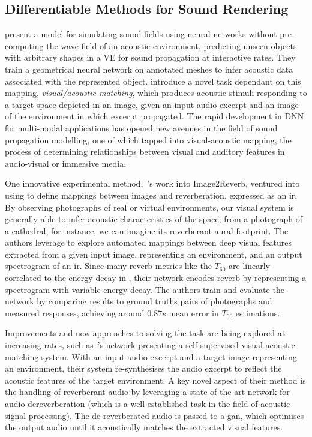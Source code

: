 \subsection{Differentiable Methods for Sound Rendering}
\cite{manocha2020differentiable} present a model for simulating sound fields using neural networks without pre-computing the wave field of an acoustic environment, predicting unseen objects with arbitrary shapes in a VE for sound propagation at interactive rates. They train a geometrical neural network on annotated meshes to infer acoustic data associated with the represented object.
\cite{chen2022visual} introduce a novel task dependant on this mapping, \textit{visual/acoustic matching}, which produces acoustic stimuli responding to a target space depicted in an image, given an input audio excerpt and an image of the environment in which excerpt propagated. The rapid development in DNN for multi-modal applications has opened new avenues in the field of sound propagation modelling, one of which tapped into visual-acoustic mapping, the process of determining relationships between visual and auditory features in audio-visual or immersive media.\par
One innovative experimental method,~\cite{Singh_2021_ICCV}'s work into Image2Reverb, ventured into using  to define mappings between images and reverberation, expressed as an \acrshort{ir}. By observing photographs of real or virtual environments, our visual system is generally able to infer acoustic characteristics of the space; from a photograph of a cathedral, for instance, we can imagine its reverberant aural footprint. The authors leverage  to explore automated mappings between deep visual features extracted from a given input image, representing an environment, and an output spectrogram of an \acrshort{ir}. Since many reverb metrics like the $T_{60}$ are linearly correlated to the energy decay in , their network encodes reverb by representing a spectrogram with variable energy decay. The authors train and evaluate the network by comparing results to ground truths pairs of photographs and measured responses, achieving around $0.87s$ mean error in $T_{60}$ estimations.\par
Improvements and new approaches to solving the task are being explored at increasing rates, such as~\cite{somayazulu2023self}'s network presenting a self-supervised visual-acoustic matching system. With an input audio excerpt and a target image representing an environment, their system re-synthesises the audio excerpt to reflect the acoustic features of the target environment. A key novel aspect of their method is the handling of reverberant audio by leveraging a state-of-the-art network for audio dereverberation (which is a well-established task in the field of acoustic signal processing). The de-reverberated audio is passed to a \acrshort{gan}, which optimises the output audio until it acoustically matches the extracted visual features.\par

